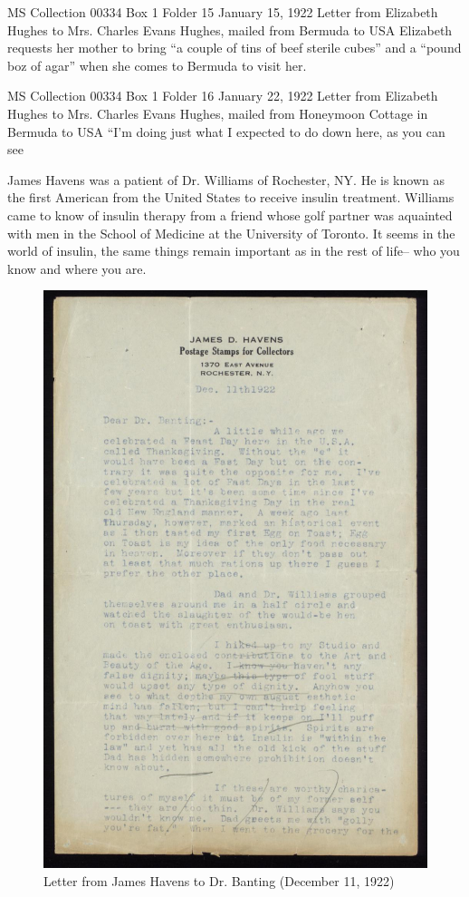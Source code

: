 \documentclass[12pt]{article}
\begin{document}
MS Collection 00334
Box 1 Folder 15
January 15, 1922
Letter from Elizabeth Hughes to Mrs. Charles Evans Hughes, mailed from Bermuda to USA
Elizabeth requests her mother to bring ``a couple of tins of beef sterile cubes'' and a ``pound boz of agar'' when she comes to Bermuda to visit her. 

MS Collection 00334
Box 1 Folder 16
January 22, 1922
Letter from Elizabeth Hughes to Mrs. Charles Evans Hughes, mailed from Honeymoon Cottage in Bermuda to USA
``I'm doing just what I expected to do down here, as you can see


James Havens was a patient of Dr. Williams of Rochester, NY. He is known as the first American from the United States to receive insulin treatment. Williams came to know of insulin therapy from a friend whose golf partner was aquainted with men in the School of Medicine at the University of Toronto. It seems in the world of insulin, the same things remain important as in the rest of life-- who you know and where you are. 
\begin{figure}[H]
\centering
  \includegraphics [width=5in]{thanksgivinghavens}
  \caption{Letter from James Havens to Dr. Banting (December 11, 1922)}
  \label{fig: Thanksgiving Letter}
\end{figure}
\end{document}
